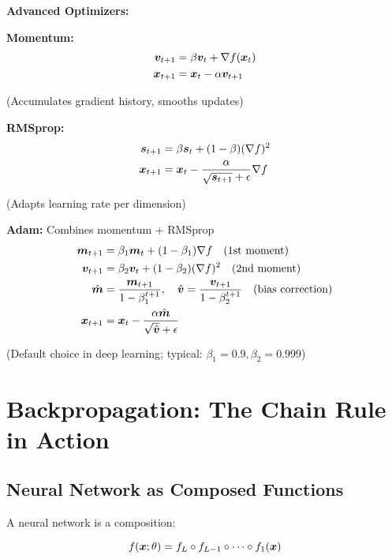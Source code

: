 \begin{seanbox}{6.7}
\textbf{Advanced Optimizers:}

\textbf{Momentum:}
\begin{align}
    \bm{v}_{t+1} &= \beta \bm{v}_t + \nabla f(\bm{x}_t) \\
    \bm{x}_{t+1} &= \bm{x}_t - \alpha \bm{v}_{t+1}
\end{align}

(Accumulates gradient history, smooths updates)

\textbf{RMSprop:}
\begin{align}
    \bm{s}_{t+1} &= \beta \bm{s}_t + (1-\beta) (\nabla f)^2 \\
    \bm{x}_{t+1} &= \bm{x}_t - \frac{\alpha}{\sqrt{\bm{s}_{t+1}} + \epsilon} \nabla f
\end{align}

(Adapts learning rate per dimension)

\textbf{Adam:} Combines momentum + RMSprop
\begin{align}
    \bm{m}_{t+1} &= \beta_1 \bm{m}_t + (1-\beta_1) \nabla f \quad \text{(1st moment)} \\
    \bm{v}_{t+1} &= \beta_2 \bm{v}_t + (1-\beta_2) (\nabla f)^2 \quad \text{(2nd moment)} \\
    \hat{\bm{m}} &= \frac{\bm{m}_{t+1}}{1 - \beta_1^{t+1}}, \quad \hat{\bm{v}} = \frac{\bm{v}_{t+1}}{1 - \beta_2^{t+1}} \quad \text{(bias correction)} \\
    \bm{x}_{t+1} &= \bm{x}_t - \frac{\alpha \hat{\bm{m}}}{\sqrt{\hat{\bm{v}}} + \epsilon}
\end{align}

(Default choice in deep learning; typical: $\beta_1 = 0.9, \beta_2 = 0.999$)
\end{seanbox}

\section{Backpropagation: The Chain Rule in Action}

\subsection{Neural Network as Composed Functions}

A neural network is a composition:

\begin{equation}
    f(\bm{x}; \theta) = f_L \circ f_{L-1} \circ \cdots \circ f_1(\bm{x})
\end{equation}

